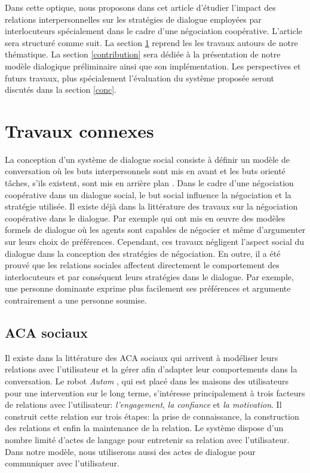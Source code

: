 \documentclass [french]{sig-alternate-05-2015}
\begin{document}
\par Dans cette optique, nous proposons dans cet article d'étudier l'impact des relations interpersonnelles sur les stratégies de dialogue employées par interlocuteurs spécialement dans le cadre d'une négociation coopérative. L'article sera structuré comme suit. La section \ref{RW} reprend les les travaux autours de notre thématique. La section \ref{contribution} sera dédiée à la présentation de notre modèle dialogique préliminaire ainsi que son implémentation. Les perspectives et futurs travaux, plus spécialement l'évaluation du système proposée seront discutés dans la section \ref{conc}.

\section{Travaux connexes}
\label{RW}
  
La conception d'un système de dialogue social consiste à définir un modèle de conversation où les buts interpersonnels sont mis en avant et les buts orienté tâches, s'ils existent, sont mis en arrière plan \cite{bickmore2005social}. Dans le cadre d'une négociation coopérative dans un dialogue social, le but social influence la négociation et la stratégie utilisée. Il existe déjà dans la littérature des travaux sur la négociation coopérative dans le dialogue. Par exemple \cite{amgoud2000arguments, daskalopulu1998handling} qui ont mis en œuvre des modèles formels de dialogue où les agents sont capables de négocier et même d'argumenter sur leurs choix de préférences. Cependant, ces travaux négligent l'aspect social du dialogue dans la conception des stratégies de négociation. En outre, il a été prouvé que les relations sociales affectent directement le comportement des interlocuteurs \cite{bickmore2000weather, bickmore2005establishing, moon1998intimate, nass2000does} et par conséquent leurs stratégies dans le dialogue. Par exemple, une personne dominante exprime plus facilement ses préférences et argumente contrairement a une personne soumise. 

\subsection{ACA sociaux}

\par Il existe dans la littérature des  ACA sociaux  qui arrivent à modéliser leurs relations avec l'utilisateur et la gérer afin d'adapter leur comportements dans la conversation. Le robot \textit{Autom} \cite{kidd2005sociable}, qui est placé dans les maisons des utilisateurs pour une intervention sur le long terme, s'intéresse principalement à trois facteurs de relations avec l'utilisateur: \textit{l'engagement}, \textit{la confiance} et \textit{la motivation}. Il construit cette relation sur trois étapes: la prise de connaissance, la construction des relations et enfin la maintenance de la relation. Le système dispose d'un nombre limité d'actes de langage pour  entretenir sa relation avec l'utilisateur. Dans notre modèle, nous utiliserons aussi des actes de dialogue pour communiquer avec l'utilisateur.
\end{document}
